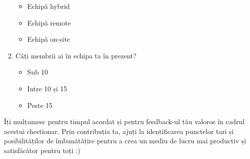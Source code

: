 \documentclass[a4paper, 12pt]{article}
\makeatletter
\newcommand*{\radiobutton}{\@ifstar{\radiobuttonON}{\radiobuttonOFF}}
\def\radiobuttonON{\raisebox{-1.5pt}{\stackinset{c}{}{c}{.35pt}{$\bullet$}{\scalebox{2}{$\circ$}}}}
\def\radiobuttonOFF{\raisebox{-1.5pt}{\scalebox{2}{$\circ$}}}
\makeatother
\begin{document}
\begin{enumerate}
			\begin{itemize}
				\item[\radiobutton] Echipă hybrid
				\item[\radiobutton] Echipă remote
				\item[\radiobutton] Echipă on-site
			\end{itemize}
		\item Câți membrii ai în echipa ta în prezent?
			\begin{itemize}
				\item[\radiobutton] Sub 10
				\item[\radiobutton] Intre 10 și 15 
				\item[\radiobutton] Peste 15
			\end{itemize}
	\end{enumerate}
	
	\quad Îți mulțumesc pentru timpul acordat și pentru feedback-ul tău valoros în cadrul acestui chestionar. Prin contribuția ta, ajuți la identificarea punctelor tari și posibilităților de îmbunătățire pentru a crea un mediu de lucru mai productiv și satisfăcător pentru toți :)
	
\end{document}
